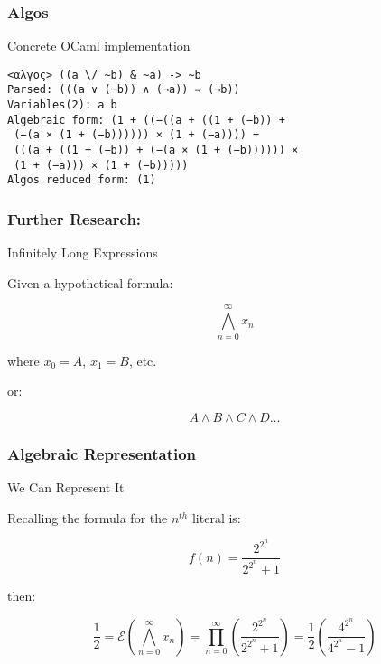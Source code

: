 \documentclass{beamer}
\begin{document}
\begin{frame}[fragile]
\frametitle{Algos}
\begin{block}
{Concrete OCaml implementation}

\begin{center}
\begin{verbatim}
<αλγος> ((a \/ ~b) & ~a) -> ~b
Parsed: (((a ∨ (¬b)) ∧ (¬a)) ⇒ (¬b))
Variables(2): a b
Algebraic form: (1 + ((−((a + ((1 + (−b)) +
 (−(a × (1 + (−b)))))) × (1 + (−a)))) +
 (((a + ((1 + (−b)) + (−(a × (1 + (−b)))))) ×
 (1 + (−a))) × (1 + (−b)))))
Algos reduced form: (1)
\end{verbatim}
\end{center}

\end{block}
\end{frame}

\begin{frame}
\frametitle{Further Research:}
\begin{exampleblock}
{Infinitely Long Expressions}

Given a hypothetical formula:

\[
\bigwedge\limits_{n=0}^\infty x_n
\]

where \(x_0 = A\), \(x_1 = B\), etc.

or:

\[
A \land B \land C \land D \ldots
\]

\end{exampleblock}
\end{frame}

\begin{frame}
\frametitle{Algebraic Representation}
\begin{block}
{We Can Represent It}

Recalling the formula for the \(n^{th}\) literal is:

\[
f(n) = \frac{2^{2^n}}{2^{2^n} + 1}
\]

then:

\[
\frac{1}{2} = \mathcal{E}\left (\bigwedge\limits_{n=0}^\infty x_n \right ) =  \prod_{n=0}^\infty \left ( \frac{2^{2^n}}{2^{2^n} + 1} \right ) = \frac{1}{2} \left ( \frac{4^{2^n}}{4^{2^n} - 1} \right )
\]

\end{block}
\end{frame}
\end{document}
